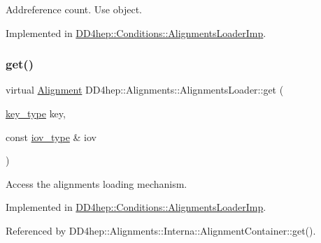 Addreference count. Use object. 



Implemented in \hyperlink{class_d_d4hep_1_1_conditions_1_1_alignments_loader_imp_ac4797b3da6e5543cf505eca8bf9cb405}{D\+D4hep\+::\+Conditions\+::\+Alignments\+Loader\+Imp}.

\hypertarget{class_d_d4hep_1_1_alignments_1_1_alignments_loader_a26866df09d8670f134fc0895444f1675}{}\label{class_d_d4hep_1_1_alignments_1_1_alignments_loader_a26866df09d8670f134fc0895444f1675} 
\subsubsection{\texorpdfstring{get()}{get()}\hspace{0.1cm}{\footnotesize\ttfamily [1/2]}}
{\footnotesize\ttfamily virtual \hyperlink{class_d_d4hep_1_1_alignments_1_1_alignment}{Alignment} D\+D4hep\+::\+Alignments\+::\+Alignments\+Loader\+::get (\begin{DoxyParamCaption}\item[{\hyperlink{class_d_d4hep_1_1_alignments_1_1_alignments_loader_af56e6294e72dacbe001c1f24b8381d5d}{key\+\_\+type}}]{key,  }\item[{const \hyperlink{class_d_d4hep_1_1_alignments_1_1_alignments_loader_a632271e6cb9198528a0826d9082561d1}{iov\+\_\+type} \&}]{iov }\end{DoxyParamCaption})\hspace{0.3cm}{\ttfamily [pure virtual]}}



Access the alignments loading mechanism. 



Implemented in \hyperlink{class_d_d4hep_1_1_conditions_1_1_alignments_loader_imp_af6db86883e1ab8af6940e3260369228d}{D\+D4hep\+::\+Conditions\+::\+Alignments\+Loader\+Imp}.



Referenced by D\+D4hep\+::\+Alignments\+::\+Interna\+::\+Alignment\+Container\+::get().

\hypertarget{class_d_d4hep_1_1_alignments_1_1_alignments_loader_a19ca11e6b9485acd5797d509ea5b4b97}{}\label{class_d_d4hep_1_1_alignments_1_1_alignments_loader_a19ca11e6b9485acd5797d509ea5b4b97} 
